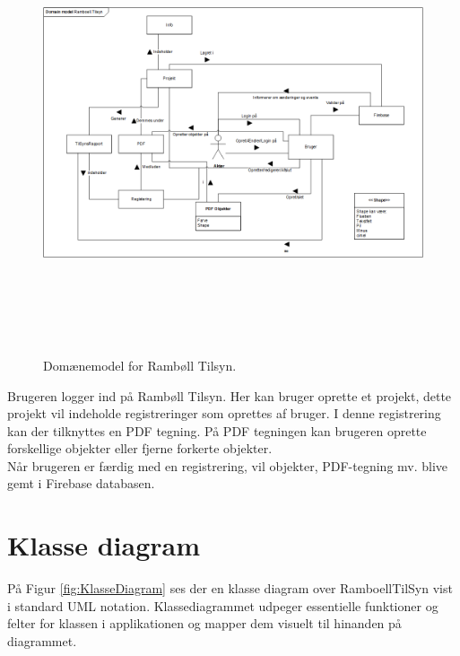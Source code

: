 \begin{figure}[H] %
	\centering
	\includegraphics[height=13cm, width=17cm]{../ArkitekturDesign/OverordnetArkitektur/Domainmodel}
	\caption{Domænemodel for Rambøll Tilsyn.}
	\label{fig:Domain}
\end{figure}
Brugeren logger ind på Rambøll Tilsyn. Her kan bruger oprette et projekt, dette projekt vil indeholde registreringer som oprettes af bruger. I denne registrering kan der tilknyttes en PDF tegning. På PDF tegningen kan brugeren oprette forskellige objekter eller fjerne forkerte objekter. \\
Når brugeren er færdig med en registrering, vil objekter, PDF-tegning mv. blive gemt i Firebase databasen.

\clearpage

\section{Klasse diagram}
På Figur \ref{fig:KlasseDiagram} ses der en klasse diagram over RamboellTilSyn vist i standard UML notation\cite{UML}. Klassediagrammet udpeger essentielle funktioner og felter for klassen i applikationen og mapper dem visuelt til hinanden på diagrammet.

